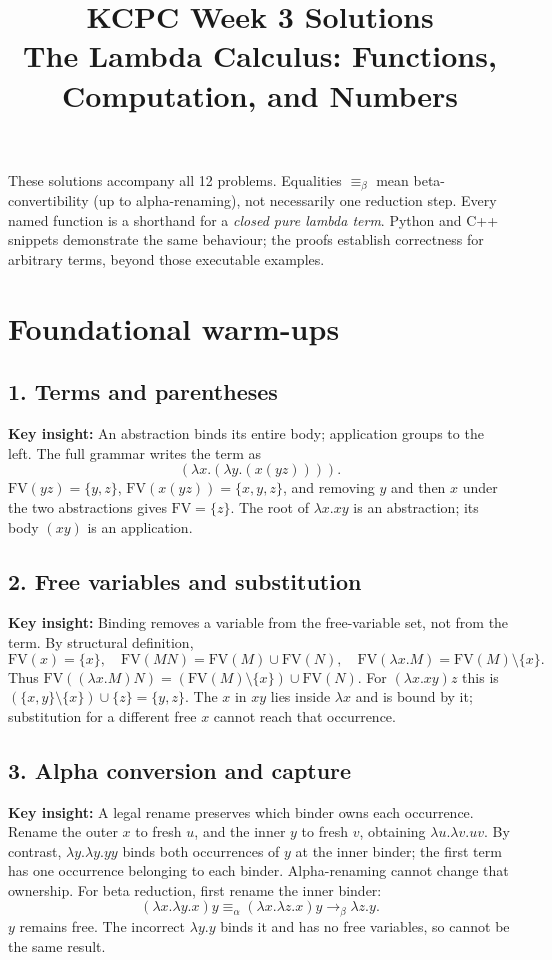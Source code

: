 \documentclass[11pt]{article}
\title{KCPC Week 3 Solutions\\The Lambda Calculus: Functions, Computation, and Numbers}
\author{}\date{}
\newcommand{\insight}[1]{\par\medskip\noindent\textbf{Key insight:} #1}
\begin{document}
\maketitle\thispagestyle{fancy}

These solutions accompany all 12 problems. Equalities $\equiv_\beta$ mean beta-convertibility (up to alpha-renaming), not necessarily one reduction step. Every named function is a shorthand for a \emph{closed pure lambda term}. Python and C++ snippets demonstrate the same behaviour; the proofs establish correctness for arbitrary terms, beyond those executable examples.

\section{Foundational warm-ups}

\subsection*{1. Terms and parentheses}
\insight{An abstraction binds its entire body; application groups to the left.}
The full grammar writes the term as
\[(\lambda x.(\lambda y.(x(yz)))).\]
$\mathrm{FV}(yz)=\{y,z\}$, $\mathrm{FV}(x(yz))=\{x,y,z\}$, and removing $y$ and then $x$ under the two abstractions gives $\mathrm{FV}=\{z\}$. The root of $\lambda x.xy$ is an abstraction; its body $(xy)$ is an application.

\subsection*{2. Free variables and substitution}
\insight{Binding removes a variable from the free-variable set, not from the term.}
By structural definition,
\[\mathrm{FV}(x)=\{x\},\quad \mathrm{FV}(MN)=\mathrm{FV}(M)\cup\mathrm{FV}(N),\quad
  \mathrm{FV}(\lambda x.M)=\mathrm{FV}(M)\setminus\{x\}.\]
Thus $\mathrm{FV}((\lambda x.M)N)=(\mathrm{FV}(M)\setminus\{x\})\cup\mathrm{FV}(N)$.
For $(\lambda x.xy)z$ this is $(\{x,y\}\setminus\{x\})\cup\{z\}=\{y,z\}$. The $x$ in $xy$ lies inside $\lambda x$ and is bound by it; substitution for a different free $x$ cannot reach that occurrence.

\subsection*{3. Alpha conversion and capture}
\insight{A legal rename preserves which binder owns each occurrence.}
Rename the outer $x$ to fresh $u$, and the inner $y$ to fresh $v$, obtaining $\lambda u.\lambda v.uv$. By contrast, $\lambda y.\lambda y.yy$ binds both occurrences of $y$ at the inner binder; the first term has one occurrence belonging to each binder. Alpha-renaming cannot change that ownership.
For beta reduction, first rename the inner binder:
\[(\lambda x.\lambda y.x)y\equiv_\alpha(\lambda x.\lambda z.x)y\to_\beta\lambda z.y.\]
$y$ remains free. The incorrect $\lambda y.y$ binds it and has no free variables, so cannot be the same result.
\end{document}
